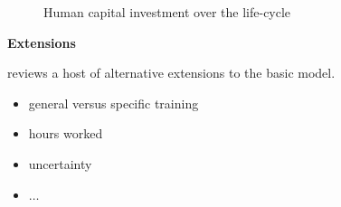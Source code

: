 \begin{frame}\begin{figure}[htp]\centering
\caption{Human capital investment over the life-cycle}
\label{Human capital investment over the life-cycle}
\end{figure}\end{frame}
\begin{frame}\textbf{Extensions}\vspace{0.3cm}

 reviews a host of alternative extensions to the basic model.\\

\begin{itemize}\setlength\itemsep{1em}
\item general versus specific training
\item hours worked
\item uncertainty
\item $\hdots$
\end{itemize}

\end{frame}
